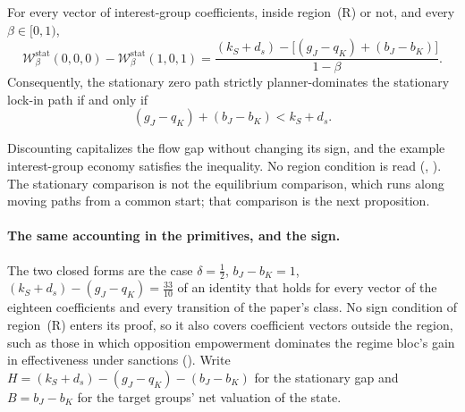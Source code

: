 \begin{proposition}
\label{prop:discounted-stationary-welfare}
For every vector of interest-group coefficients, inside region~(R) or not, and
every $\beta\in[0,1)$,
\[
\mathcal W_\beta^{\mathrm{stat}}(0,0,0)
-\mathcal W_\beta^{\mathrm{stat}}(1,0,1)
=
\frac{(k_S+d_s)-\bigl[(g_J-q_K)+(b_J-b_K)\bigr]}
     {1-\beta}.
\]
Consequently, the stationary zero path strictly planner-dominates the
stationary lock-in path if and only if
\[
(g_J-q_K)+(b_J-b_K)<k_S+d_s.
\]
\end{proposition}

Discounting capitalizes the flow gap without changing its sign, and the
example interest-group economy satisfies the inequality. No region condition is
read (,
). The stationary
comparison is not the equilibrium comparison, which runs along moving paths
from a common start; that comparison is the next proposition.

\paragraph{The same accounting in the primitives, and the sign.}
The two closed forms are the case $\delta=\tfrac12$, $b_J-b_K=1$,
$(k_S+d_s)-(g_J-q_K)=\tfrac{33}{10}$ of an identity that holds for every
vector of the eighteen coefficients and every transition of the paper's class.
No sign condition of region~(R) enters its proof, so it also covers
coefficient vectors outside the region, such as those in which opposition
empowerment dominates the regime bloc's gain in effectiveness under sanctions (). Write $H=(k_S+d_s)-(g_J-q_K)-(b_J-b_K)$ for the
stationary gap and $B=b_J-b_K$ for the target groups' net valuation of the
state.

